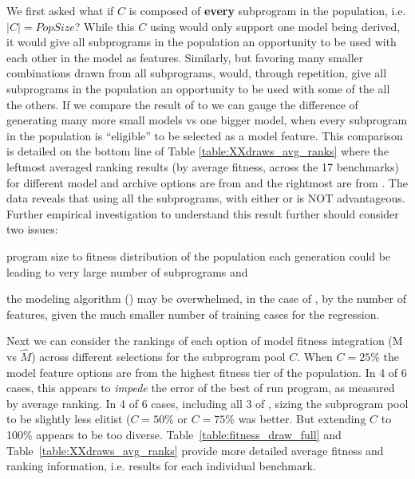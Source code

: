 We first asked what if  $C$ is composed of \textbf{every} subprogram in the population, i.e. $|C| = PopSize$?  While this $C$ using \FULL would only support one model being derived, it would give all subprograms in the population an opportunity to be used with each other in the model as features.  Similarly, but favoring many smaller combinations drawn from all subprograms, \DRAW would, through repetition,  give all subprograms in the population an opportunity to be used with some of the all the others.   If we compare the result of \DRAW to \FULL we can gauge the difference of generating many more small models vs one bigger model, when every subprogram in the population is ``eligible'' to be selected as a model feature.   This comparison is detailed on the bottom line of Table \ref{table:XXdraws_avg_ranks} where the leftmost averaged ranking results (by average fitness, across the 17 benchmarks) for different model and archive options are from \DRAW and the rightmost are from \FULL. The data reveals that using all the subprograms, with either \FULL or \DRAW is NOT advantageous. Further empirical investigation to understand this result further should consider two issues: \begin{inparaenum} \item program size to fitness distribution of the population each generation could be leading to very large number of subprograms and \item the modeling algorithm (\REPTREE) may be overwhelmed, in the case of \FULL, by the number of features, given the much smaller number of training cases for the regression. \end{inparaenum}

Next we can consider the rankings of each option of model fitness integration (M vs $\hat M$) across different selections for the subprogram pool $C$.  When $C=25\%$ the model feature options are from the highest fitness tier of the population. In 4 of 6 cases, this appears to \textit{impede} the error of the best of run program, as measured by average ranking.  In 4 of 6 cases, including all 3 of \DRAW,  sizing the subprogram pool to be slightly less elitist ($C=50\%$ or $C=75\%$ was better. But extending $C$ to 100\% appears to be too diverse.  Table~\ref{table:fitness_draw_full} and Table~\ref{table:XXdraws_avg_ranks} provide more detailed average fitness and ranking information, i.e. results for each individual benchmark.  

